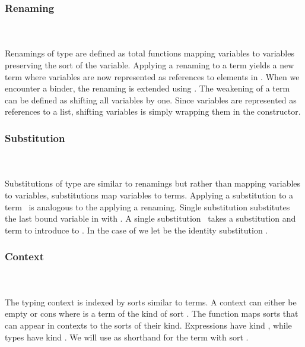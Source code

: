 \subsubsection{Renaming}\hfill\\\\
Renamings  of type    are defined as total functions mapping variables    to variables    preserving the sort  of the variable.
\FRen
Applying a renaming    to a term    yields a new term    where variables are now represented as references    to elements in .
\Fren
When we encounter a binder, the renaming is extended using \Frenext. 
The weakening of a term can be defined as shifting all variables by one.
\Fwk 
Since variables are represented as references to a list, shifting variables is simply wrapping them in the  constructor.

\subsubsection{Substitution}\hfill\\\\
Substitutions  of type    are similar to renamings but rather than mapping variables to variables, substitutions map variables to terms.
\FSub
Applying a substitution to a term \Fsub\ is analogous to the applying a renaming. 
Single substitution  \Data{[}  \Data{]} substitutes the last bound variable in  with .
\Fsubs
A single substitution \Fsinglesub\ takes a substitution  and term  to introduce  to . In the case of \Data{\_[\_]} we let  be the identity substitution \Fidsub.

\subsubsection{Context}\hfill\\\\
The typing context   is indexed by sorts  similar to terms. 
\FCtx
A context can either be empty  or cons    where  is a term of the kind of sort . The function  maps sorts that can appear in contexts to the sorts of their kind.
\Fkind
Expressions have kind , while types have kind . We will use  as shorthand for the term with sort  .

